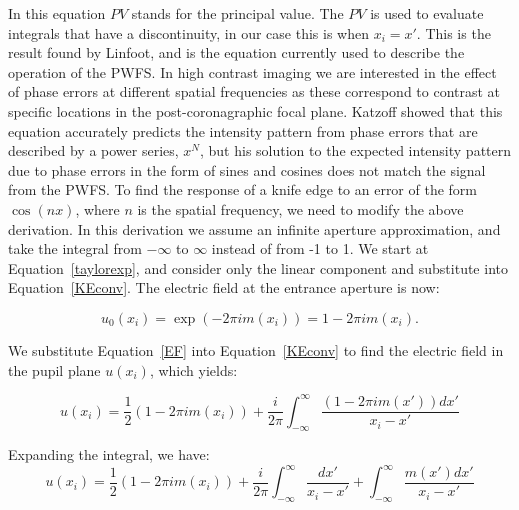 
In this equation $PV$ stands for the principal value. The $PV$ is used to evaluate integrals that have a discontinuity, in our case this is when $x_i=x'$.\cite{johansson1999hilbert} This is the result found by Linfoot\cite{linfoot1948theory}, and is the equation currently used to describe the operation of the PWFS.\cite{verinaud2004nature} In high contrast imaging we are interested in the effect of phase errors at different spatial frequencies as these correspond to contrast at specific locations in the post-coronagraphic focal plane. Katzoff\cite{katzoff1971quantitative} showed that this equation accurately predicts the intensity pattern from phase errors that are described by a power series, $x^{N}$, but his solution to the expected intensity pattern due to phase errors in the form of sines and cosines does not match the signal from the PWFS. To find the response of a knife edge to an error of the form $\cos(nx)$, where $n$ is the spatial frequency, we need to modify the above derivation. In this derivation we assume an infinite aperture approximation, and take the integral from $-\infty$ to $\infty$ instead of from -1 to 1. We start at Equation~\ref{taylorexp}, and consider only the linear component and substitute into Equation~\ref{KEconv}.  The electric field at the entrance aperture is now: 


\begin{equation}
    u_0(x_i )=\exp(-2\pi i m(x_i ))=1-2\pi i m(x_i).
    \label{EF}
\end{equation}

We substitute Equation~\ref{EF} into Equation~\ref{KEconv} to find the electric field in the pupil plane $u(x_i)$, which yields:

\begin{equation}
    u(x_i)= \frac{1}{2}(1-2\pi i m(x_i))+\frac{i}{2\pi}\int_{-\infty}^\infty \frac{(1-2\pi i m(x'))dx'}{x_i-x'}
    \label{HT}
\end{equation}

Expanding the integral, we have:
\begin{equation}
    u(x_i)= \frac{1}{2}(1-2\pi i m(x_i))+\frac{i}{2\pi}\int_{-\infty}^\infty \frac{dx'}{x_i-x'}+\int_{-\infty}^\infty \frac{ m(x')dx'}{x_i-x'}
\end{equation}

